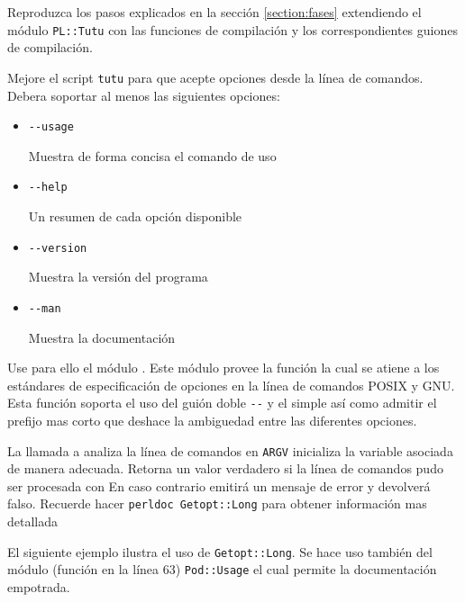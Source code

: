 \label{practica:fases}
Reproduzca los pasos explicados en la sección
\ref{section:fases} extendiendo el módulo \verb|PL::Tutu|
con las funciones de compilación y los correspondientes
guiones de compilación.

Mejore el script \verb|tutu| para que acepte opciones desde la línea de comandos.
Debera soportar al menos las siguientes opciones:
\begin{itemize}
\item \verb|--usage| 

Muestra de forma concisa el comando de uso
\item \verb|--help| 

Un resumen de cada opción disponible

\item \verb|--version|

Muestra la versión del programa

\item \verb|--man| 

Muestra la documentación
\end{itemize}

Use para ello el módulo .
Este módulo provee la función  la cual
se atiene a los estándares de especificación
de opciones en la línea de comandos POSIX y GNU.
Esta función soporta el uso del guión doble \verb|--|
y el simple así como admitir el prefijo mas corto
que deshace la ambiguedad entre las diferentes opciones.

La llamada a 
 analiza la l\'inea de comandos en
\verb|ARGV|
inicializa la variable asociada de manera adecuada. Retorna un valor verdadero
si la l\'inea de comandos pudo ser procesada con
En caso contrario emitir\'a
un mensaje de error y devolver\'a falso. Recuerde hacer
\verb|perldoc Getopt::Long|
para obtener informaci\'on mas detallada

El siguiente ejemplo ilustra el uso de \verb|Getopt::Long|.
Se hace uso también del módulo (función  en la línea 63)
\verb|Pod::Usage| el cual permite la documentación empotrada.

